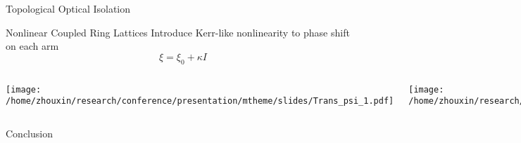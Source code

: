 \documentclass{beamer}
\begin{document}
\begin{frame}{Topological Optical Isolation}

         \begin{block}{Nonlinear Coupled Ring Lattices}
         Introduce Kerr-like nonlinearity to phase shift on each arm
         \begin{equation}
         \xi = \xi_0 + \kappa I        
         \end{equation}
       \begin{columns}
             \hspace*{0.5em}
             \texttt{[image: /home/zhouxin/research/conference/presentation/mtheme/slides/Trans\_psi\_1.pdf]}\hspace*{-10.5em}
 
            \hspace*{0.5em}
             \texttt{[image: /home/zhouxin/research/conference/presentation/mtheme/slides/IRP2.pdf]}\hspace*{-10.5em}





         \end{columns}

         \end{block}

\end{frame}
\begin{frame}{Conclusion}

\end{frame}
\end{document}
